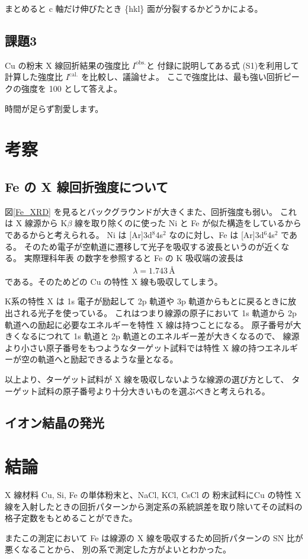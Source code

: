\documentclass[11pt,dvipdfmx,a4paper]{jsarticle}
\begin{document}
まとめると c 軸だけ伸びたとき \{hkl\} 面が分裂するかどうかによる。

\subsection*{課題3}
Cu の粉末 X 線回折結果の強度比 \(I^{\text{obs.}}\)と
付録に説明してある式 (S1)を利用して計算した強度比 \(I^{\text{cal.}}\)
を比較し、議論せよ。
ここで強度比は、最も強い回折ピークの強度を 100 として答えよ。

時間が足らず割愛します。

\section{考察}
\subsection{Fe の X 線回折強度について}
図\ref{Fe_XRD} を見るとバックグラウンドが大きくまた、回折強度も弱い。
これは X 線源から K\(\beta\) 線を取り除くのに使った Ni と Fe が似た構造をしているからであるからと考えられる。
Ni は [Ar]3d\(^8\)4s\(^2\) なのに対し、Fe は [Ar]3d\(^6\)4s\(^2\) である。
そのため電子が空軌道に遷移して光子を吸収する波長というのが近くなる。
実際理科年表\cite{rikanenpyo} の数字を参照すると Fe の K 吸収端の波長は
\begin{align}
	\lambda = 1.743 \,\text{\AA}
\end{align}
である。そのためどの Cu の特性 X 線も吸収してしまう。

K系の特性 X は 1s 電子が励起して 2p 軌道や 3p 軌道からもとに戻るときに放出される光子を使っている。
これはつまり線源の原子において 1s 軌道から 2p 軌道への励起に必要なエネルギーを特性 X 線は持つことになる。
原子番号が大きくなるにつれて 1s 軌道と 2p 軌道とのエネルギー差が大きくなるので、
線源より小さい原子番号をもつようなターゲット試料では特性 X 線の持つエネルギーが空の軌道へと励起できるような量となる。

以上より、ターゲット試料が X 線を吸収しないような線源の選び方として、
ターゲット試料の原子番号より十分大きいものを選ぶべきと考えられる。

\subsection{イオン結晶の発光}


\section{結論}
X 線材料 Cu, Si, Fe の単体粉末と、NaCl, KCl, CsCl の
粉末試料にCu の特性 X 線を入射したときの回折パターンから測定系の系統誤差を取り除いてその試料の格子定数をもとめることができた。

またこの測定において Fe は線源の X 線を吸収するため回折パターンの SN 比が悪くなることから、
別の系で測定した方がよいとわかった。




\end{document}
